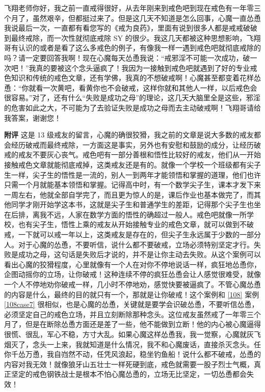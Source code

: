 \begin{case}
    飞翔老师你好，我之前一直戒得很好，从去年刚来到戒色吧到现在戒色有一年零三个月了，虽然艰辛，但都挺过来了。但是这几天不知道是怎么回事，心魔一直怂恿我说最后一次，一直都有看您写的《戒为良药》，里面有说到很多人都是戒戒破破到最终戒除，而一次性就彻底戒除 SY 的很少。我这几天都被这种思想影响，飞翔哥有认识的或者是看了这么多戒色的例子，有像我一样一遇到戒色吧就彻底戒除的吗？请一定要回答我啊！现在心魔每天怂恿我说：“戒邪淫不可能一次成功，破一次吧！”我真的要被这个念头逼疯了！我因为一接触到戒色吧就遇到了好的专业戒色知识和传统的戒色文章，还有学佛，我真的不想破戒啊！心魔甚至都变着花样怂恿：“你就看一次黄吧，看黄你也不会破戒，这样你就和其他人一样，以后戒色会很容易。”对了，还有什么“失败是成功之母”的理论，这几天大脑里全是这些，邪淫的危害如此之大，不可能为了去验证失败是成功之母而去主动破戒啊！飞翔哥请给我答案，谢谢您！

    \textbf{附评} 这是 13 级戒友的留言，心魔的确很狡猾，我之前的文章是说大多数的戒友都会经历破戒而最终戒除，一方面这是事实，另外也有安慰和鼓励的成分，让经历破戒的戒友不要灰心丧气。戒色吧有一部分善根和悟性比较好的戒友，他们从一开始接触戒色文章就能彻底戒掉，这类戒友还是有的。就像一个学校一个班级都有尖子生一样，尖子生的悟性是一流的，别人一到两年才能领悟和掌握的道理，他们也许只需一个月就能基本领悟和掌握。记得高中时，有一个数学尖子生，课本才发下来一周左右，他就全部自学完了，而且更为惊人的是，课后作业也基本做完了，而其他同学才刚开始学这本书，这就是尖子生和普通学生的差距，记得那个尖子生也坐在后排，离我不远，人家在数学方面的悟性的确超过一般人。戒色吧就像一所学校，也有尖子生，悟性上乘的戒友从开始接触专业的戒色文章，就可以做到不破戒，一下就可以戒一年以上，这类戒友是存在的，但尖子生永远属于少数的一部分人。对于心魔的怂恿，不要听信，说什么都不要破戒，立场必须特别坚定才行。失败是成功之母，这句话是失败后才说的，并不是让你主动去失败。从这个案例可以看出心魔的狡猾程度，心里就像有一个人在对你不停地说话一样，疯狂地怂恿你，企图动摇你的立场，让你破戒！这种连续不停的疯狂怂恿会让人感觉很难受，就像一个人不停地劝你破戒一样，几小时不停地劝，感觉快要被逼疯了。不管心魔怂恿的内容是什么，最终的目的就只有一个，那就是让你破戒！这个案例和 \ref{108} 案例 \ref{108case7} 很相似，也是心魔的怂恿，关键就是要学会识破怂恿，不要听信怂恿，必须坚定自己的戒色立场，并且立刻断除那种念头。这位戒友虽然戒了一年零三个月了，但是在断除怂恿方面还是差了一些，他不能做到立断！他的内心被心魔逼得很慌、很乱，军心不稳，方寸大乱。如果心魔这样怂恿我，我一觉察，心魔就灰飞烟灭了，念头一上来，我就知道是什么情况，我不和心魔废话，直接杀灭念头。任你千怂万恿，我自岿然不动，任凭风浪起，稳坐钓鱼船！说什么都不破戒，怂恿的内容对我无效！就像狼牙山五壮士一样死硬到底，戒色就需要一股子烈士气概，真正坚定的戒色钢铁战士是根本不怕心魔怂恿的，立场无比坚定，一切怂恿都会失效！
\end{case}

